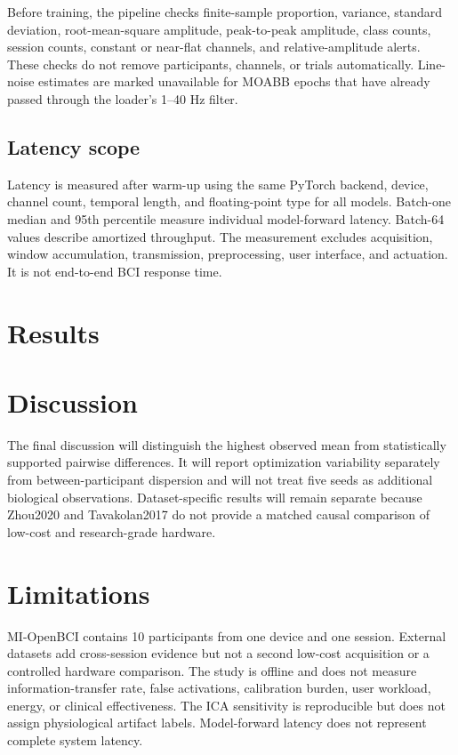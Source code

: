 \documentclass[conference]{IEEEtran}
\begin{document}
Before training, the pipeline checks finite-sample proportion, variance, standard deviation,
root-mean-square amplitude, peak-to-peak amplitude, class counts, session counts, constant or
near-flat channels, and relative-amplitude alerts. These checks do not remove participants,
channels, or trials automatically. Line-noise estimates are marked unavailable for MOABB epochs
that have already passed through the loader's 1--40 Hz filter.

\subsection{Latency scope}

Latency is measured after warm-up using the same PyTorch backend, device, channel count, temporal
length, and floating-point type for all models. Batch-one median and 95th percentile measure
individual model-forward latency. Batch-64 values describe amortized throughput. The measurement
excludes acquisition, window accumulation, transmission, preprocessing, user interface, and
actuation. It is not end-to-end BCI response time.

\section{Results}



\section{Discussion}

The final discussion will distinguish the highest observed mean from statistically supported
pairwise differences. It will report optimization variability separately from between-participant
dispersion and will not treat five seeds as additional biological observations. Dataset-specific
results will remain separate because Zhou2020 and Tavakolan2017 do not provide a matched causal
comparison of low-cost and research-grade hardware.

\section{Limitations}

MI-OpenBCI contains 10 participants from one device and one session. External datasets add
cross-session evidence but not a second low-cost acquisition or a controlled hardware comparison.
The study is offline and does not measure information-transfer rate, false activations, calibration
burden, user workload, energy, or clinical effectiveness. The ICA sensitivity is reproducible but
does not assign physiological artifact labels. Model-forward latency does not represent complete
system latency.
\end{document}
